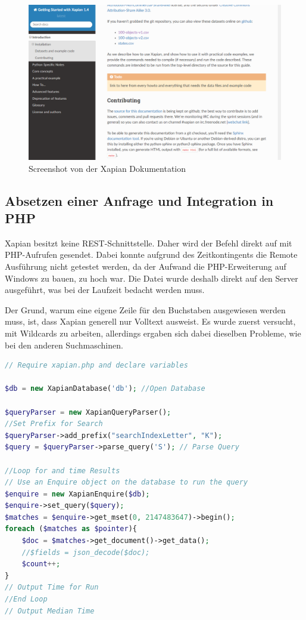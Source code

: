 \begin{figure}
	\centering
	\includegraphics[width=1\linewidth]{images/xapian_doku.png}
	\caption{Screenshot von der Xapian Dokumentation}
	\label{img:xapianDoku}
\end{figure}

\subsection{Absetzen einer Anfrage und Integration in PHP}

Xapian besitzt keine REST-Schnittstelle. Daher wird der Befehl direkt auf mit PHP-Aufrufen gesendet. Dabei konnte aufgrund des Zeitkon­tin­gents die Remote Ausführung nicht getestet werden, da der Aufwand die PHP-Erweiterung auf Windows zu bauen, zu hoch war. Die Datei wurde deshalb direkt auf den Server ausgeführt, was bei der Laufzeit bedacht werden muss. 

Der Grund, warum eine eigene Zeile für den Buchstaben ausgewiesen werden muss, ist, dass Xapian generell nur Volltext ausweist. Es wurde zuerst versucht, mit Wildcards zu arbeiten, allerdings ergaben sich dabei dieselben Probleme, wie bei den anderen Suchmaschinen.

\begin{lstlisting}[language=php, frame=single, label={lst:XapPhpQuery}, 
	morekeywords={type,uninvertible,indexed,stored,field,multiValued, name}, caption=Skript zur Suche von Daten in Xapian,captionpos=b] 
// Require xapian.php and declare variables

$db = new XapianDatabase('db'); //Open Database

$queryParser = new XapianQueryParser();
//Set Prefix for Search
$queryParser->add_prefix("searchIndexLetter", "K"); 
$query = $queryParser->parse_query('S'); // Parse Query

//Loop for and time Results
// Use an Enquire object on the database to run the query
$enquire = new XapianEnquire($db);
$enquire->set_query($query);
$matches = $enquire->get_mset(0, 2147483647)->begin();
foreach ($matches as $pointer){
	$doc = $matches->get_document()->get_data();
	//$fields = json_decode($doc);
	$count++;
}
// Output Time for Run
//End Loop 
// Output Median Time
	
\end{lstlisting}

